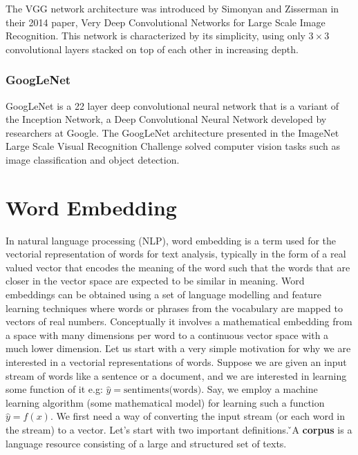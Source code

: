 The VGG network architecture was introduced by Simonyan and Zisserman in their 2014 paper, Very Deep Convolutional
Networks for Large Scale Image Recognition. This network is characterized by its simplicity, using only $3 \times 3$
convolutional layers stacked on top of each other in increasing depth.


\subsubsection{GoogLeNet}

GoogLeNet is a 22 layer deep convolutional neural network that is a variant of the Inception Network, a Deep
Convolutional Neural Network developed by researchers at Google. The GoogLeNet architecture presented in the ImageNet
Large Scale Visual Recognition Challenge solved computer vision tasks such as image classification and object detection.


\section{Word Embedding}

In natural language processing (NLP), word embedding is a term used for the vectorial representation of words for
text analysis, typically in the form of a real valued vector that encodes the meaning of the word such that the words
that are closer in the vector space are expected to be similar in meaning. Word embeddings can be obtained using a
set of language modelling and feature learning techniques where words or phrases from the vocabulary are mapped to
vectors of real numbers. Conceptually it involves a mathematical embedding from a space with many dimensions per word
to a continuous vector space with a much lower dimension. \v

Let us start with a very simple motivation for why we are interested in a vectorial representations of words. Suppose
we are given an input stream of words like a sentence or a document, and we are interested in learning some function
of it e.g: $\hat{y} = \text{sentiments(words)}$. Say, we employ a machine learning algorithm (some mathematical
model) for learning such a function $\hat{y} = f(x)$. We first need a way of converting the input stream (or each
word in the stream) to a vector. Let's start with two important definitions. \v

\bd[Corpus]
A \textbf{corpus} is a language resource consisting of a large and structured set of texts.
\ed

